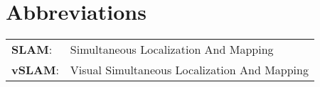   \section*{Abbreviations}
\newcommand{\abbreviation}[2]{\textbf{#1}: & #2}
  
  \begin{table}[H]\setlength\tabcolsep{10pt}
      \begin{tabular}{ll}

      
\abbreviation{SLAM}{Simultaneous Localization And Mapping} \\
\abbreviation{vSLAM}{Visual Simultaneous Localization And Mapping}\\


      \end{tabular}
      \label{tab:my_label}
  \end{table}
